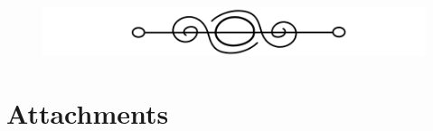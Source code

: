 \documentclass[10pt]{article}
\begin{document}
\maketitle

\tableofcontents    %

\begin{figure}[h]       %
    \centering
    \includegraphics[scale=0.25]{./img/break.png}
\end{figure}

\newpage





\newpage

\appendix

\section{Attachments}
\end{document}
